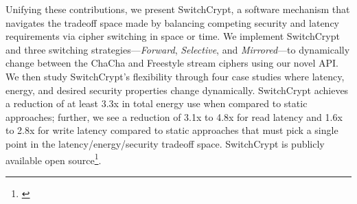 Unifying these contributions, we present SwitchCrypt, a software mechanism that
navigates the tradeoff space made by balancing competing security and latency
requirements via cipher switching in space or time. We implement SwitchCrypt and
three switching strategies---\emph{Forward}, \emph{Selective}, and
\emph{Mirrored}---to dynamically change between the ChaCha and Freestyle stream
ciphers using our novel API. We then study SwitchCrypt's flexibility through
four case studies where latency, energy, and desired security properties change
dynamically. SwitchCrypt achieves a reduction of at least 3.3x in total energy
use when compared to static approaches; further, we see a reduction of 3.1x to
4.8x for read latency and 1.6x to 2.8x for write latency compared to static
approaches that must pick a single point in the latency/energy/security tradeoff
space. SwitchCrypt is publicly available open source\footnote{\label{note1}\SystemURI}.
